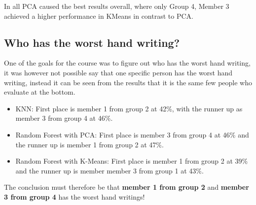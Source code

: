 \documentclass[report]{subfiles}
\begin{document}
In all PCA caused the best results overall, where only Group 4, Member 3 achieved a higher performance in KMeans in contrast to PCA.

\subsection{Who has the worst hand writing?}
One of the goals for the course was to figure out who has the worst hand writing, it was however not possible say that one specific person has the worst hand writing, instead it can be seen from the results that it is the same few people who evaluate at the bottom.
\begin{itemize}
	\item KNN: First place is member 1 from group 2 at 42\%, with the runner up as member 3 from group 4 at 46\%.
	\item Random Forest with PCA: First place is member 3 from group 4 at 46\% and the runner up is member 1 from group 2 at 47\%.
	\item Random Forest with K-Means: First place is member 1 from group 2 at 39\% and the runner up is member member 3 from group 1 at 43\%.
\end{itemize}
The conclusion must therefore be that \textbf{member 1 from group 2} and \textbf{member 3 from group 4} has the worst hand writings!
\end{document}
